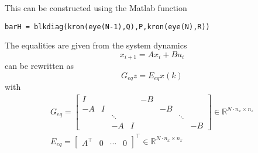 This can be constructed using the Matlab function

\begin{small}
    \texttt{barH = blkdiag(kron(eye(N-1),Q),P,kron(eye(N),R))}
\end{small}

\newpar{}

The equalities are given from the system dynamics
\begin{equation*}
    x_{i+1} = Ax_i + Bu_i
\end{equation*}
can be rewritten as
\begin{equation*}
    G_{eq} z = E_{eq} x(k)
\end{equation*}
with
    {\small
        \begin{gather*}
            G_{eq} = \left[
                \begin{array}{cccc|cccc} %
                    I  &   &        &   & -B &    &        &    \\
                    -A & I &        &   &    & -B &        &    \\
                       &   & \ddots &   &    &    & \ddots &    \\
                       &   & -A     & I &    &    &        & -B
                \end{array}
                \right] \in \mathbb{R}^{N\cdot n_x \times n_z}\\
            E_{eq} = \begin{bmatrix}
                A^\top & 0 & \cdots & 0
            \end{bmatrix}^\top \in \mathbb{R}^{N\cdot n_x \times n_x}
        \end{gather*}
    }

\newpar{}

